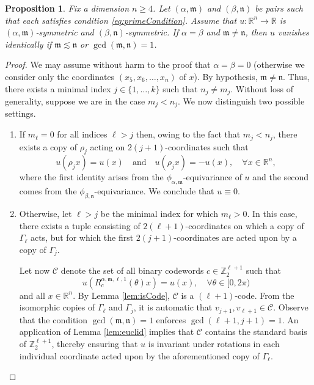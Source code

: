 \documentclass[10pt, reqno]{amsart}
\newcommand{\RR}{\mathbb{R}}
\newcommand{\ZZ}{\mathbb{Z}}
\newcommand{\C}{\mathcal{C}}
\newcommand{\m}{\mathfrak{m}}
\newcommand{\n}{\mathfrak{n}}
\numberwithin{equation}{section}
\theoremstyle{definition}
\theoremstyle{remark}
\theoremstyle{plain}
\newtheorem{prop}{Proposition}[section]
\begin{document}
	\begin{prop}\label{prop:distinct}
		Fix a dimension $n \ge 4$. Let $(\alpha, \m)$ and $(\beta, \n)$ be pairs such that each satisfies condition \eqref{eq:primeCondition}. Assume that $u : \RR^n \to \RR$ is $(\alpha,\m)$-symmetric and $(\beta,\n)$-symmetric. If $\alpha = \beta$ and $\m \ne \n$, then $u$ vanishes identically if $\m \lesssim \n$ or $\gcd(\m,\n) = 1$.
	\end{prop}
	\begin{proof}
		We may assume without harm to the proof that $\alpha = \beta = 0$ (otherwise we consider only the coordinates $(x_5,x_6,\dots, x_n)$ of $x$). By hypothesis, $\m \ne \n$. Thus, there exists a minimal index $j \in \{1,\dots, k\}$ such that $n_j \ne m_j$. Without loss of generality, suppose we are in the case $m_j < n_j$. We now distinguish two possible settings.
		\begin{enumerate}[leftmargin=*]
			\item If $m_\ell = 0$ for all indices $\ell > j$ then, owing to the fact that $m_j < n_j$, there exists a copy of $\rho_j$ acting on $2(j+1)$-coordinates such that
			\[
			u(\rho_j x) = u(x) \quad \text{and} \quad u(\rho_jx) = -u(x), \quad \forall x \in \RR^n,
			\]
			where the first identity arises from the $\phi_{\alpha,\m}$-equivariance of $u$ and the second comes from the $\phi_{\beta,\n}$-equivariance. We conclude that $u \equiv 0$.
			\item Otherwise, let $\ell > j$ be the minimal index for which $m_\ell > 0$. In this case, there exists a tuple consisting of $2(\ell+1)$-coordinates on which a copy of $\Gamma_{\ell}$ acts, but for which the first $2(j+1)$-coordinates are acted upon by a copy of $\Gamma_{j}$. 
			
			Let now $\C$ denote the set of all binary codewords $c \in \ZZ_2^{\ell+1}$ such that 
			\[
			u(R_c^{\alpha,\m, \ell, 1}(\theta)x) = u(x), \quad \forall \theta \in [0,2\pi)
			\]
			and all $x \in \RR^n$. By Lemma \ref{lem:isCode}, $\C$ is a $(\ell+1)$-code. From the isomorphic copies of $\Gamma_{\ell}$ and $\Gamma_j$, it is automatic that $v_{j+1}, v_{\ell+1} \in \C$. Observe that the condition $\gcd(\m,\n) = 1$ enforces $\gcd(\ell+1, j+1) = 1$. An application of Lemma \ref{lem:euclid} implies that $\C$ contains the standard basis of $\ZZ_2^{\ell+1}$, thereby ensuring that $u$ is invariant under rotations in each individual coordinate acted upon by the aforementioned copy of $\Gamma_{\ell}$.
			

\end{enumerate}
\end{proof}
\end{document}
